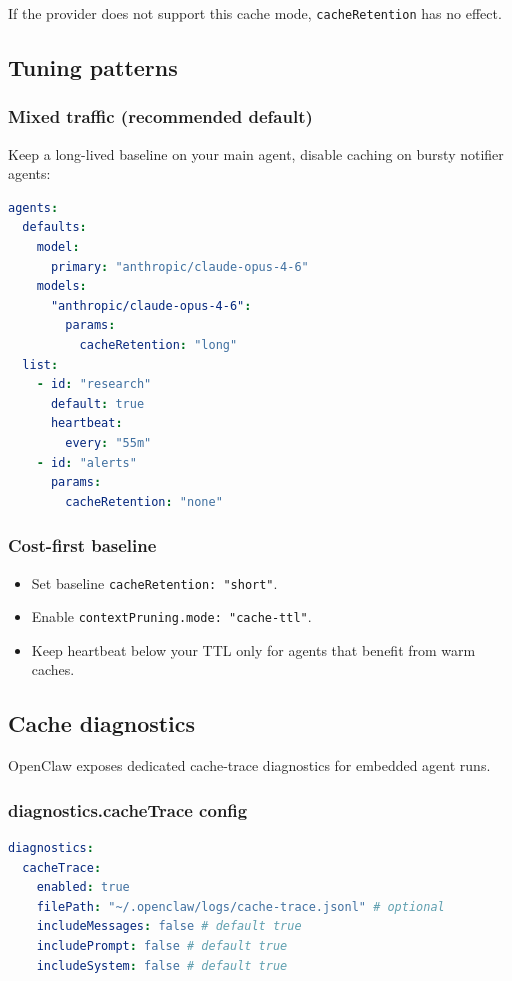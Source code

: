 If the provider does not support this cache mode, \texttt{cacheRetention} has no effect.

\subsection{Tuning patterns}


\subsubsection{Mixed traffic (recommended default)}


Keep a long-lived baseline on your main agent, disable caching on bursty notifier agents:

\begin{lstlisting}[language=yaml]
agents:
  defaults:
    model:
      primary: "anthropic/claude-opus-4-6"
    models:
      "anthropic/claude-opus-4-6":
        params:
          cacheRetention: "long"
  list:
    - id: "research"
      default: true
      heartbeat:
        every: "55m"
    - id: "alerts"
      params:
        cacheRetention: "none"
\end{lstlisting}


\subsubsection{Cost-first baseline}


\begin{itemize}
  \item Set baseline \texttt{cacheRetention: "short"}.
  \item Enable \texttt{contextPruning.mode: "cache-ttl"}.
  \item Keep heartbeat below your TTL only for agents that benefit from warm caches.
\end{itemize}


\subsection{Cache diagnostics}


OpenClaw exposes dedicated cache-trace diagnostics for embedded agent runs.

\subsubsection{diagnostics.cacheTrace config}


\begin{lstlisting}[language=yaml]
diagnostics:
  cacheTrace:
    enabled: true
    filePath: "~/.openclaw/logs/cache-trace.jsonl" # optional
    includeMessages: false # default true
    includePrompt: false # default true
    includeSystem: false # default true
\end{lstlisting}


